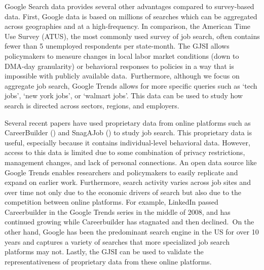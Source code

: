 \documentclass[12pt]{article}
\begin{document}
\begin{spacing}{2}
Google Search data provides several other advantages compared to survey-based data. First, Google data is based on millions of searches which can be aggregated across geographies and at a high-frequency. In comparison, the American Time Use Survey (ATUS), the most commonly used survey of job search, often contains fewer than 5 unemployed respondents per state-month. The GJSI allows policymakers to measure changes in local labor market conditions (down to DMA-day granularity) or behavioral responses to policies in a way that is impossible with publicly available data.\footnotemark \ Furthermore, although we focus on aggregate job search, Google Trends allows for more specific queries such as `tech jobs', `new york jobs', or `walmart jobs'. This data can be used to study how search is directed across sectors, regions, and employers.

Several recent papers have used proprietary data from online platforms such as CareerBuilder (\citet{Marinescu2015}) and SnagAJob (\citet{Kudlyak2013}) to study job search. This proprietary data is useful, especially because it contains individual-level behavioral data. However, access to this data is limited due to some combination of privacy restrictions, management changes, and lack of personal connections. An open data source like Google Trends enables researchers and policymakers to easily replicate and expand on earlier work. Furthermore, search activity varies across job sites and over time not only due to the economic drivers of search but also due to the competition between online platforms. For example, LinkedIn passed Careerbuilder in the Google Trends series in the middle of 2008, and has continued growing while Careerbuilder has stagnated and then declined.\footnotemark \ On the other hand, Google has been the predominant search engine in the US for over 10 years and captures a variety of searches that more specialized job search platforms may not. Lastly, the GJSI can be used to validate the representativeness of proprietary data from these online platforms.





\end{spacing}
\end{document}
